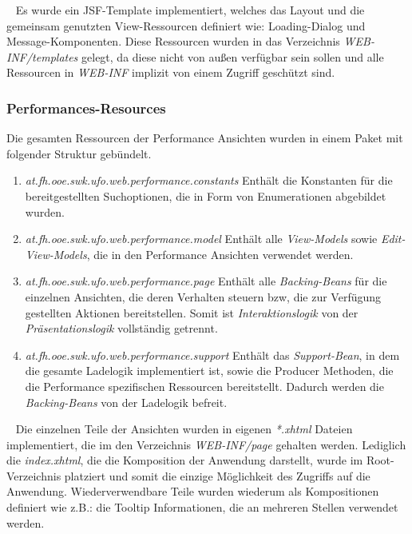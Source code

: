 \documentclass[11pt, a4paper, twoside]{article}   	%
\begin{document}
\ \newline
Es wurde ein JSF-Template implementiert, welches das Layout und die gemeinsam genutzten View-Ressourcen definiert wie: Loading-Dialog und Message-Komponenten. Diese Ressourcen wurden in das Verzeichnis \emph{WEB-INF/templates} gelegt, da diese nicht von außen verfügbar sein sollen und alle Ressourcen in \emph{WEB-INF} implizit von einem Zugriff geschützt sind.
\ \newpage

\subsubsection{Performances-Resources}
Die gesamten Ressourcen der Performance Ansichten wurden in einem Paket mit folgender Struktur gebündelt.
\begin{enumerate}
	\item\emph{at.fh.ooe.swk.ufo.web.performance.constants}
	\newline
	Enthält die Konstanten für die bereitgestellten Suchoptionen, die in Form von Enumerationen abgebildet wurden.
	\item\emph{at.fh.ooe.swk.ufo.web.performance.model}
	\newline
	Enthält alle \emph{View-Models} sowie \emph{Edit-View-Models}, die in den Performance Ansichten verwendet werden.
	\item\emph{at.fh.ooe.swk.ufo.web.performance.page}
	\newline
	Enthält alle \emph{Backing-Beans} für die einzelnen Ansichten, die deren Verhalten steuern bzw, die zur Verfügung gestellten Aktionen bereitstellen. Somit ist \emph{Interaktionslogik} von der \emph{Präsentationslogik} vollständig getrennt.
	\item\emph{at.fh.ooe.swk.ufo.web.performance.support}
	\newline
	Enthält das \emph{Support-Bean}, in dem die gesamte Ladelogik implementiert ist, sowie die Producer Methoden, die die Performance spezifischen Ressourcen bereitstellt. Dadurch werden die \emph{Backing-Beans} von der Ladelogik befreit.	
\end{enumerate}	
\ \newline
Die einzelnen Teile der Ansichten wurden in eigenen \emph{*.xhtml} Dateien implementiert, die im den Verzeichnis \emph{WEB-INF/page} gehalten werden. Lediglich die \emph{index.xhtml}, die die Komposition der Anwendung darstellt, wurde im Root-Verzeichnis platziert und somit die einzige Möglichkeit des Zugriffs auf die Anwendung. Wiederverwendbare Teile wurden wiederum als Kompositionen definiert wie z.B.: die Tooltip Informationen, die an mehreren Stellen verwendet werden.
\newpage
\end{document}

